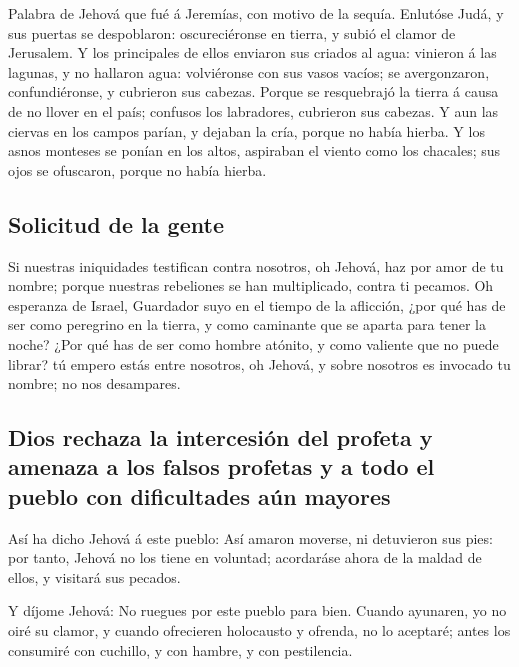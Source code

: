  Palabra de Jehová que fué á Jeremías, con motivo de la
sequía.  Enlutóse Judá, y sus puertas se despoblaron:
oscureciéronse en tierra, y subió el clamor de Jerusalem.  Y
los principales de ellos enviaron sus criados al agua: vinieron á las
lagunas, y no hallaron agua: volviéronse con sus vasos vacíos; se
avergonzaron, confundiéronse, y cubrieron sus cabezas. 
Porque se resquebrajó la tierra á causa de no llover en el país;
confusos los labradores, cubrieron sus cabezas.  Y aun las
ciervas en los campos parían, y dejaban la cría, porque no había hierba.
 Y los asnos monteses se ponían en los altos, aspiraban el
viento como los chacales; sus ojos se ofuscaron, porque no había hierba.

\hypertarget{solicitud-de-la-gente}{%
\subsection{Solicitud de la gente}\label{solicitud-de-la-gente}}

 Si nuestras iniquidades testifican contra nosotros, oh
Jehová, haz por amor de tu nombre; porque nuestras rebeliones se han
multiplicado, contra ti pecamos.  Oh esperanza de Israel,
Guardador suyo en el tiempo de la aflicción, ¿por qué has de ser como
peregrino en la tierra, y como caminante que se aparta para tener la
noche?  ¿Por qué has de ser como hombre atónito, y como
valiente que no puede librar? tú empero estás entre nosotros, oh Jehová,
y sobre nosotros es invocado tu nombre; no nos desampares.

\hypertarget{dios-rechaza-la-intercesiuxf3n-del-profeta-y-amenaza-a-los-falsos-profetas-y-a-todo-el-pueblo-con-dificultades-auxfan-mayores}{%
\subsection{Dios rechaza la intercesión del profeta y amenaza a los
falsos profetas y a todo el pueblo con dificultades aún
mayores}\label{dios-rechaza-la-intercesiuxf3n-del-profeta-y-amenaza-a-los-falsos-profetas-y-a-todo-el-pueblo-con-dificultades-auxfan-mayores}}

 Así ha dicho Jehová á este pueblo: Así amaron moverse, ni
detuvieron sus pies: por tanto, Jehová no los tiene en voluntad;
acordaráse ahora de la maldad de ellos, y visitará sus pecados.

 Y díjome Jehová: No ruegues por este pueblo para bien.
 Cuando ayunaren, yo no oiré su clamor, y cuando ofrecieren
holocausto y ofrenda, no lo aceptaré; antes los consumiré con cuchillo,
y con hambre, y con pestilencia.

